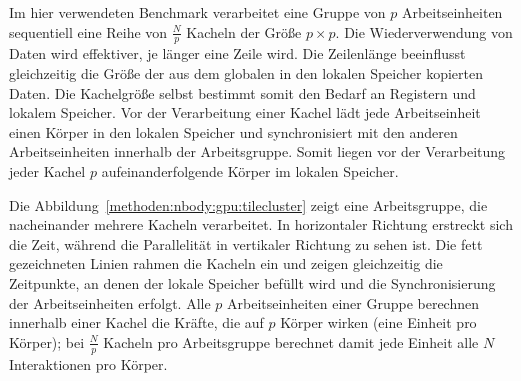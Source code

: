 Im hier verwendeten Benchmark verarbeitet eine Gruppe von $p$ Arbeitseinheiten
sequentiell eine Reihe von $\frac{N}{p}$ Kacheln der Größe $p \times p$. Die
Wiederverwendung von Daten wird effektiver, je länger eine Zeile wird. Die
Zeilenlänge beeinflusst gleichzeitig die Größe der aus dem globalen in den
lokalen Speicher kopierten Daten. Die Kachelgröße selbst bestimmt somit den
Bedarf an Registern und lokalem Speicher. Vor der Verarbeitung einer Kachel lädt
jede Arbeitseinheit einen Körper in den lokalen Speicher und synchronisiert mit
den anderen Arbeitseinheiten innerhalb der Arbeitsgruppe. Somit liegen vor der
Verarbeitung jeder Kachel $p$ aufeinanderfolgende Körper im lokalen Speicher.

Die Abbildung~\ref{methoden:nbody:gpu:tilecluster} zeigt eine Arbeitsgruppe,
die nacheinander mehrere Kacheln verarbeitet. In horizontaler Richtung erstreckt
sich die Zeit, während die Parallelität in vertikaler Richtung zu sehen ist. Die
fett gezeichneten Linien rahmen die Kacheln ein und zeigen gleichzeitig die
Zeitpunkte, an denen der lokale Speicher befüllt wird und die Synchronisierung
der Arbeitseinheiten erfolgt. Alle $p$ Arbeitseinheiten einer Gruppe berechnen
innerhalb einer Kachel die Kräfte, die auf $p$ Körper wirken (eine Einheit pro
Körper); bei $\frac{N}{p}$ Kacheln pro Arbeitsgruppe berechnet damit jede
Einheit alle $N$ Interaktionen pro Körper.

